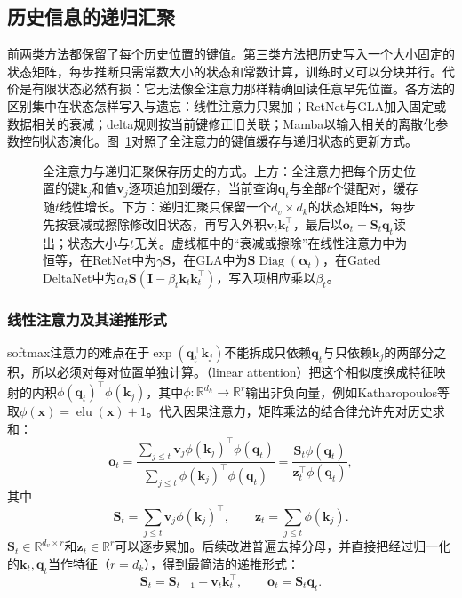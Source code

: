 \subsection{历史信息的递归汇聚}
\label{sec:nlp-llm-recurrent-state}

前两类方法都保留了每个历史位置的键值。第三类方法把历史写入一个大小固定的状态矩阵，每步推断只需常数大小的状态和常数计算，训练时又可以分块并行。代价是有限状态必然有损：它无法像全注意力那样精确回读任意早先位置。各方法的区别集中在状态怎样写入与遗忘：线性注意力只累加；RetNet与GLA加入固定或数据相关的衰减；delta规则按当前键修正旧关联；Mamba以输入相关的离散化参数控制状态演化。图~\ref{fig:nlp-llm-context-state-update}对照了全注意力的键值缓存与递归状态的更新方式。

\begin{figure}[!t]
  \centering
  
  \caption{全注意力与递归汇聚保存历史的方式。上方：全注意力把每个历史位置的键$\bm k_j$和值$\bm v_j$逐项追加到缓存，当前查询$\bm q_t$与全部$t$个键配对，缓存随$t$线性增长。下方：递归汇聚只保留一个$d_v\times d_k$的状态矩阵$\bm S$，每步先按衰减或擦除修改旧状态，再写入外积$\bm v_t\bm k_t^{\top}$，最后以$\bm o_t=\bm S_t\bm q_t$读出；状态大小与$t$无关。虚线框中的“衰减或擦除”在线性注意力中为恒等，在RetNet中为$\gamma\bm S$，在GLA中为$\bm S\operatorname{Diag}(\bm\alpha_t)$，在Gated DeltaNet中为$\alpha_t\bm S(\bm I-\beta_t\bm k_t\bm k_t^{\top})$，写入项相应乘以$\beta_t$。}
  \label{fig:nlp-llm-context-state-update}
\end{figure}

\subsubsection{线性注意力及其递推形式}
\label{sec:nlp-llm-linear-attention}

softmax注意力的难点在于$\exp(\bm q_t^{\top}\bm k_j)$不能拆成只依赖$\bm q_t$与只依赖$\bm k_j$的两部分之积，所以必须对每对位置单独计算。（linear attention）把这个相似度换成特征映射的内积$\phi(\bm q_t)^{\top}\phi(\bm k_j)$，其中$\phi:\mathbb R^{d_h}\to\mathbb R^{r}$输出非负向量，例如Katharopoulos等取$\phi(\bm x)=\operatorname{elu}(\bm x)+1$。代入因果注意力，矩阵乘法的结合律允许先对历史求和：
\[
 \bm o_t=\frac{\sum_{j\le t}\bm v_j\phi(\bm k_j)^{\top}\phi(\bm q_t)}{\sum_{j\le t}\phi(\bm k_j)^{\top}\phi(\bm q_t)}
 =\frac{\bm S_t\phi(\bm q_t)}{\bm z_t^{\top}\phi(\bm q_t)},
\]
其中
\[
 \bm S_t=\sum_{j\le t}\bm v_j\phi(\bm k_j)^{\top},\qquad
 \bm z_t=\sum_{j\le t}\phi(\bm k_j).
\]
$\bm S_t\in\mathbb R^{d_v\times r}$和$\bm z_t\in\mathbb R^{r}$可以逐步累加。后续改进普遍去掉分母，并直接把经过归一化的$\bm k_t,\bm q_t$当作特征（$r=d_k$），得到最简洁的递推形式：
\begin{equation}
 \bm S_t=\bm S_{t-1}+\bm v_t\bm k_t^{\top},\qquad
 \bm o_t=\bm S_t\bm q_t .
 \label{eq:nlp-llm-linear-recurrence}
\end{equation}

